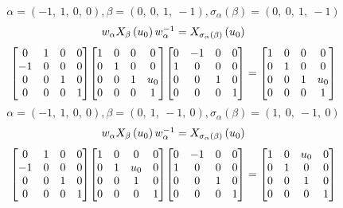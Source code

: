 \documentclass[11pt]{article}
\theoremstyle{definition}
\begin{document}
\[
\alpha = \left( -1, \  1, \  0, \  0\right), \beta = \left( 0, \  0, \  1, \  -1\right), \sigma_{\alpha}(\beta) = \left( 0, \  0, \  1, \  -1\right)
\]
\[
\scaletoalign{\textwidth}{w_{\alpha} X_{\beta}\left(u_{0}\right) w_{\alpha}^{-1} = X_{\sigma_{\alpha}\left(\beta\right)}\left(u_{0}\right)}
\]
\[
\scaletoalign{\textwidth}{{\left[\begin{matrix}0 & 1 & 0 & 0\\-1 & 0 & 0 & 0\\0 & 0 & 1 & 0\\0 & 0 & 0 & 1\end{matrix}\right]} {\left[\begin{matrix}1 & 0 & 0 & 0\\0 & 1 & 0 & 0\\0 & 0 & 1 & u_{0}\\0 & 0 & 0 & 1\end{matrix}\right]} {\left[\begin{matrix}0 & -1 & 0 & 0\\1 & 0 & 0 & 0\\0 & 0 & 1 & 0\\0 & 0 & 0 & 1\end{matrix}\right]} = {\left[\begin{matrix}1 & 0 & 0 & 0\\0 & 1 & 0 & 0\\0 & 0 & 1 & u_{0}\\0 & 0 & 0 & 1\end{matrix}\right]}}
\]
\[
\alpha = \left( -1, \  1, \  0, \  0\right), \beta = \left( 0, \  1, \  -1, \  0\right), \sigma_{\alpha}(\beta) = \left( 1, \  0, \  -1, \  0\right)
\]
\[
\scaletoalign{\textwidth}{w_{\alpha} X_{\beta}\left(u_{0}\right) w_{\alpha}^{-1} = X_{\sigma_{\alpha}\left(\beta\right)}\left(u_{0}\right)}
\]
\[
\scaletoalign{\textwidth}{{\left[\begin{matrix}0 & 1 & 0 & 0\\-1 & 0 & 0 & 0\\0 & 0 & 1 & 0\\0 & 0 & 0 & 1\end{matrix}\right]} {\left[\begin{matrix}1 & 0 & 0 & 0\\0 & 1 & u_{0} & 0\\0 & 0 & 1 & 0\\0 & 0 & 0 & 1\end{matrix}\right]} {\left[\begin{matrix}0 & -1 & 0 & 0\\1 & 0 & 0 & 0\\0 & 0 & 1 & 0\\0 & 0 & 0 & 1\end{matrix}\right]} = {\left[\begin{matrix}1 & 0 & u_{0} & 0\\0 & 1 & 0 & 0\\0 & 0 & 1 & 0\\0 & 0 & 0 & 1\end{matrix}\right]}}
\]
\end{document}
